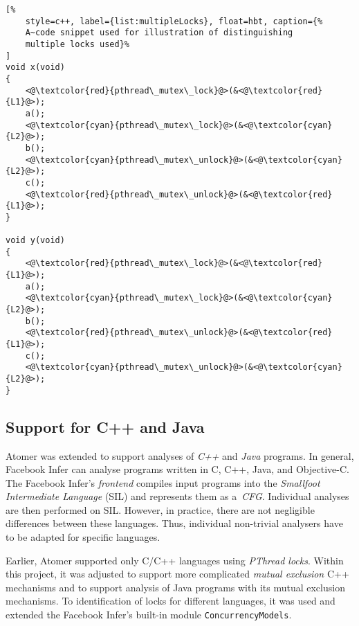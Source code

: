 \begin{lstlisting}[%
    style=c++, label={list:multipleLocks}, float=hbt, caption={%
    A~code snippet used for illustration of distinguishing
    multiple locks used}%
]
void x(void)
{
    <@\textcolor{red}{pthread\_mutex\_lock}@>(&<@\textcolor{red}{L1}@>);
    a();
    <@\textcolor{cyan}{pthread\_mutex\_lock}@>(&<@\textcolor{cyan}{L2}@>);
    b();
    <@\textcolor{cyan}{pthread\_mutex\_unlock}@>(&<@\textcolor{cyan}{L2}@>);
    c();
    <@\textcolor{red}{pthread\_mutex\_unlock}@>(&<@\textcolor{red}{L1}@>);
}

void y(void)
{
    <@\textcolor{red}{pthread\_mutex\_lock}@>(&<@\textcolor{red}{L1}@>);
    a();
    <@\textcolor{cyan}{pthread\_mutex\_lock}@>(&<@\textcolor{cyan}{L2}@>);
    b();
    <@\textcolor{red}{pthread\_mutex\_unlock}@>(&<@\textcolor{red}{L1}@>);
    c();
    <@\textcolor{cyan}{pthread\_mutex\_unlock}@>(&<@\textcolor{cyan}{L2}@>);
}
\end{lstlisting}

\subsection{Support for C++ and Java}

Atomer was extended to support analyses of \emph{C++} and \emph{Java}
programs. In general, Facebook Infer can analyse programs written in C, C++,
Java, and Objective-C. The Facebook Infer's \emph{frontend} compiles input
programs into the \emph{Smallfoot Intermediate Language} (SIL) and represents
them as a~\emph{CFG}. Individual analyses are then performed on SIL. However,
in practice, there are not negligible differences between these languages.
Thus, individual non-trivial analysers have to be adapted for specific
languages.

Earlier, Atomer supported only C/C++ languages using \emph{PThread locks}.
Within this project, it was adjusted to support more complicated \emph{mutual
exclusion} C++ mechanisms and to support analysis of Java programs with its
mutual exclusion mechanisms. To identification of locks for different
languages, it was used and extended the Facebook Infer's built-in module
\texttt{ConcurrencyModels}.

